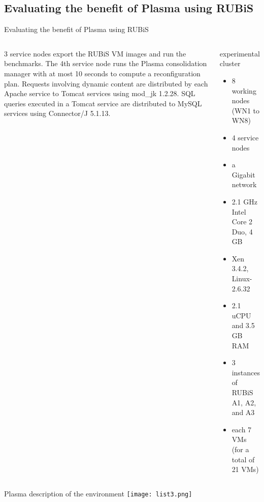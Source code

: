 \subsection{Evaluating the benefit of Plasma using RUBiS} 
\begin{frame}{Evaluating the benefit of Plasma using RUBiS}
\begin{columns}[t]
3 service nodes export the RUBiS VM images and run the benchmarks.
The 4th service node runs the Plasma consolidation manager with at most
10 seconds to compute a reconfiguration plan.
\br
 Requests involving dynamic content are distributed by each Apache service to Tomcat
services using mod\_jk 1.2.28. 
\br
SQL queries executed in a Tomcat service are
distributed to MySQL services using Connector/J 5.1.13. 
\begin{block}{experimental cluster}
\begin{itemize}
\item 8 working nodes (WN1 to WN8) \\
\item 4 service nodes \\
\item a Gigabit network \\
\br
\item 2.1 GHz Intel Core 2 Duo, 4 GB \\
\item Xen 3.4.2, Linux-2.6.32 \\
\item 2.1 uCPU and 3.5 GB RAM \\
\br
\item 3 instances of RUBiS A1, A2, and A3 \\
\item each 7 VMs (for a total of 21 VMs) \\

\end{itemize}
\end{block}
\end{columns}

\end{frame}
\begin{frame}{Plasma description of the environment}
\texttt{[image: list3.png]} 

\end{frame}
